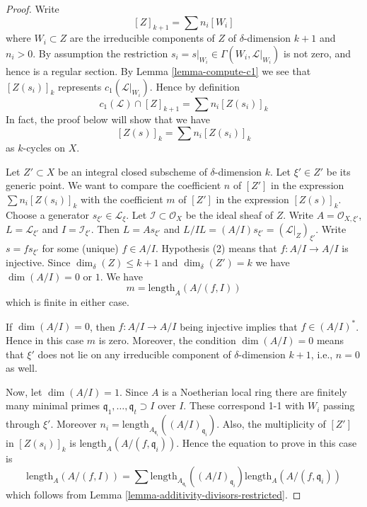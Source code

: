 \begin{proof}
Write
$$
[Z]_{k + 1} = \sum n_i[W_i]
$$
where $W_i \subset Z$ are the irreducible components of
$Z$ of $\delta$-dimension $k + 1$ and $n_i > 0$.
By assumption the restriction
$s_i = s|_{W_i} \in \Gamma(W_i, \mathcal{L}|_{W_i})$ is not
zero, and hence is a regular section. By Lemma \ref{lemma-compute-c1}
we see that $[Z(s_i)]_k$ represents $c_1(\mathcal{L}|_{W_i})$.
Hence by definition
$$
c_1(\mathcal{L}) \cap [Z]_{k + 1} = \sum n_i[Z(s_i)]_k
$$
In fact, the proof below will show that we have
\begin{equation}
\label{equation-equal-as-cycles}
[Z(s)]_k =  \sum n_i[Z(s_i)]_k
\end{equation}
as $k$-cycles on $X$.

\medskip\noindent
Let $Z' \subset X$ be an integral closed subscheme of
$\delta$-dimension $k$. Let $\xi' \in Z'$ be its generic point.
We want to compare the coefficient $n$ of $[Z']$ in the expression
$\sum n_i[Z(s_i)]_k$ with the coefficient $m$ of $[Z']$ in the
expression $[Z(s)]_k$. Choose a generator $s_{\xi'} \in \mathcal{L}_\xi$.
Let $\mathcal{I} \subset \mathcal{O}_X$ be the ideal sheaf of $Z$.
Write $A = \mathcal{O}_{X, \xi'}$, $L = \mathcal{L}_{\xi'}$
and $I = \mathcal{I}_{\xi'}$. Then $L = As_{\xi'}$ and
$L/IL = (A/I)s_{\xi'} = (\mathcal{L}|_Z)_{\xi'}$.
Write $s = f s_{\xi'}$ for some (unique) $f \in A/I$.
Hypothesis (2) means that $f : A/I \to A/I$ is injective.
Since $\dim_\delta(Z) \leq k + 1$ and $\dim_\delta(Z') = k$
we have $\dim(A/I) = 0$ or $1$. We have
$$
m = \text{length}_A(A/(f, I))
$$
which is finite in either case.

\medskip\noindent
If $\dim(A/I) = 0$, then $f : A/I \to A/I$ being injective
implies that $f \in (A/I)^*$. Hence in this case $m$ is zero.
Moreover, the condition $\dim(A/I) = 0$ means that $\xi'$
does not lie on any irreducible component of $\delta$-dimension
$k + 1$, i.e., $n = 0$ as well.

\medskip\noindent
Now, let $\dim(A/I) = 1$.
Since $A$ is a Noetherian local ring there are finitely
many minimal primes $\mathfrak q_1, \ldots, \mathfrak q_t \supset I$
over $I$. These correspond 1-1 with $W_i$ passing through $\xi'$.
Moreover $n_i = \text{length}_{A_{\mathfrak q_i}}((A/I)_{\mathfrak q_i})$.
Also, the multiplicity of $[Z']$ in $[Z(s_i)]_k$ is
$\text{length}_A(A/(f, \mathfrak q_i))$.
Hence the equation to prove in this case is
$$
\text{length}_A(A/(f, I))
=
\sum \text{length}_{A_{\mathfrak q_i}}((A/I)_{\mathfrak q_i})
\text{length}_A(A/(f, \mathfrak q_i))
$$
which follows from Lemma \ref{lemma-additivity-divisors-restricted}.
\end{proof}




